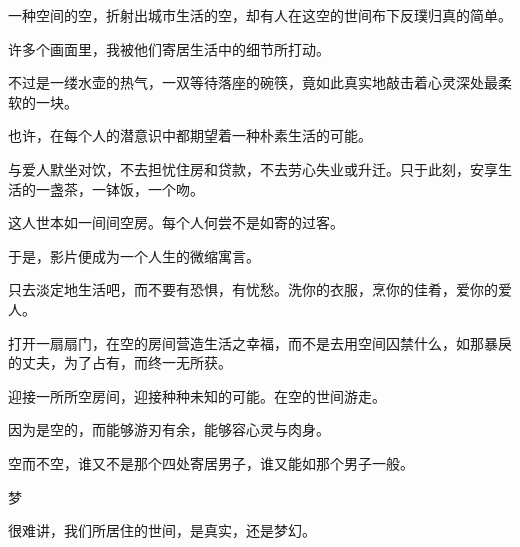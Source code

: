 \documentclass[12pt,a4paper]{article}
\newcommand{\subpart}[1]{
	\begingroup \par
	\vspace{1ex} \centering #1
	\par \endgroup
}
\begin{document}
		一种空间的空，折射出城市生活的空，却有人在这空的世间布下反璞归真的简单。\par
		许多个画面里，我被他们寄居生活中的细节所打动。\par
		不过是一缕水壶的热气，一双等待落座的碗筷，竟如此真实地敲击着心灵深处最柔软的一块。\par
		也许，在每个人的潜意识中都期望着一种朴素生活的可能。\par
		与爱人默坐对饮，不去担忧住房和贷款，不去劳心失业或升迁。只于此刻，安享生活的一盏茶，一钵饭，一个吻。\par
		这人世本如一间间空房。每个人何尝不是如寄的过客。\par
		于是，影片便成为一个人生的微缩寓言。\par
		只去淡定地生活吧，而不要有恐惧，有忧愁。洗你的衣服，烹你的佳肴，爱你的爱人。\par
		打开一扇扇门，在空的房间营造生活之幸福，而不是去用空间囚禁什么，如那暴戾的丈夫，为了占有，而终一无所获。\par
		迎接一所所空房间，迎接种种未知的可能。在空的世间游走。\par
		因为是空的，而能够游刃有余，能够容心灵与肉身。\par
		空而不空，谁又不是那个四处寄居男子，谁又能如那个男子一般。


		\subpart{梦}

		很难讲，我们所居住的世间，是真实，还是梦幻。
\end{document}
